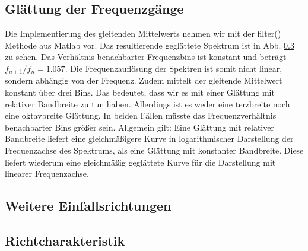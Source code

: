 \subsection{Glättung der Frequenzgänge}
Die Implementierung des gleitenden Mittelwerts nehmen wir mit der filter() Methode aus Matlab vor.
Das resultierende geglättete Spektrum ist in Abb. \ref{} zu sehen. Das Verhältnis benachbarter Frequenzbins ist konstant und beträgt $f_{n+1}/f_{n} = 1.057$.
Die Frequenzauflösung der Spektren ist somit nicht linear, sondern abhängig von der Frequenz.
Zudem mittelt der gleitende Mittelwert konstant über drei Bins.
Das bedeutet, dass wir es mit einer Glättung mit relativer Bandbreite zu tun haben.
Allerdings ist es weder eine terzbreite noch eine oktavbreite Glättung.
In beiden Fällen müsste das Frequenzverhältnis benachbarter Bins größer sein.
Allgemein gilt: Eine Glättung mit relativer Bandbreite liefert eine gleichmäßigere Kurve in logarithmischer Darstellung der Frequenzachse des Spektrums, als eine Glättung mit konstanter Bandbreite.
Diese liefert wiederum eine gleichmäßig geglättete Kurve für die Darstellung mit linearer Frequenzachse.

\subsection{Weitere Einfallsrichtungen}

\subsection{Richtcharakteristik}